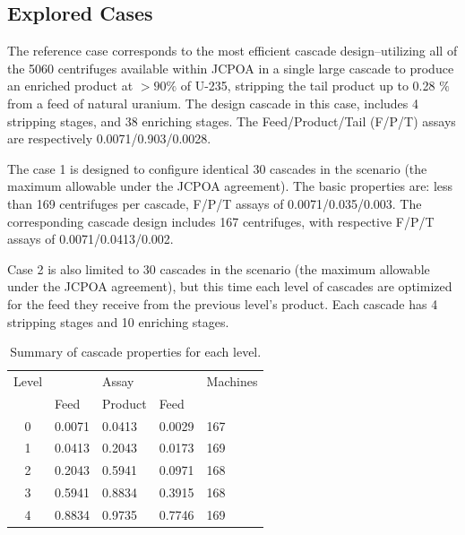 \documentclass{anstrans}
\begin{document}
\subsection{Explored Cases}

The reference case corresponds to the most efficient cascade design--utilizing
all of the 5060 centrifuges available within JCPOA in a single large cascade to
produce an enriched product at $>90\%$ of U-235, stripping the tail product up
to 0.28 $\%$ from a feed of natural uranium.  The design cascade in this case,
includes 4 stripping stages, and 38 enriching stages. The Feed/Product/Tail
(F/P/T) assays are respectively 0.0071/0.903/0.0028.


The case 1 is designed to configure identical 30 cascades in the scenario (the maximum
allowable under the JCPOA agreement). The basic
properties are: less than 169 centrifuges per cascade, F/P/T assays of
0.0071/0.035/0.003. The corresponding cascade design includes 167 centrifuges, with
respective F/P/T assays of 0.0071/0.0413/0.002.


Case 2 is also limited to 30 cascades in the scenario (the maximum allowable
under the JCPOA agreement), but this time each level of cascades are optimized
for the feed they receive from the previous level's product. Each cascade has 4
stripping stages and 10 enriching stages.

\begin{table}[htb]
\centering
  \caption{Summary of cascade properties for each level.}
\begin{tabular}{cllll}
\toprule

Level   &           & Assay     &       & Machines  \\
        & Feed      & Product   & Feed  &           \\
\midrule
0       & 0.0071    & 0.0413    & 0.0029 & 167       \\
1       & 0.0413    & 0.2043    & 0.0173 & 169       \\
2       & 0.2043    & 0.5941    & 0.0971 & 168       \\
3       & 0.5941    & 0.8834    & 0.3915 & 168       \\
4       & 0.8834    & 0.9735    & 0.7746 & 169       \\

\bottomrule
\end{tabular}

  \label{tab:cascadelvl}
\end{table}
\end{document}
